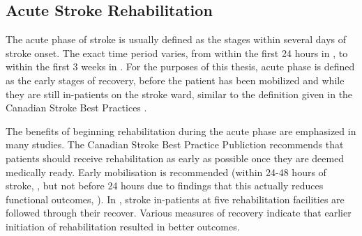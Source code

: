 \documentclass[12pt]{report}
\begin{document}


\subsection{Acute Stroke Rehabilitation}

The acute phase of stroke is usually defined as the stages within several days of stroke onset. The exact time period varies, from within the first 24 hours in \cite{Veerbeek2014}, to within the first 3 weeks in \cite{Cameirao2008}. For the purposes of this thesis, acute phase is defined as the early stages of recovery, before the patient has been mobilized and while they are still in-patients on the stroke ward, similar to the definition given in the Canadian Stroke Best Practices \cite{Casaubon2016}. 

The benefits of beginning rehabilitation during the acute phase are emphasized in many studies. The Canadian Stroke Best Practice Publiction recommends that patients should receive rehabilitation as early as possible once they are deemed medically ready. Early mobilisation is recommended (within 24-48 hours of stroke, \cite{Casaubon2016}, but not before 24 hours due to findings that this actually reduces functional outcomes, \cite{AVERTTrialCollaborationgroup2015}). In \cite{Horn2005}, stroke in-patients at five rehabilitation facilities are followed through their recover. Various measures of recovery indicate that earlier initiation of rehabilitation resulted in better outcomes. 
\end{document}
